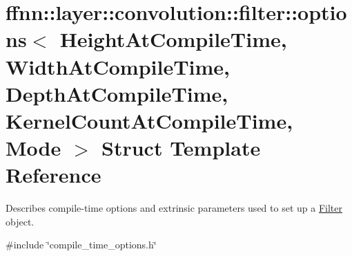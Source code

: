 \hypertarget{structffnn_1_1layer_1_1convolution_1_1filter_1_1options}{\section{ffnn\-:\-:layer\-:\-:convolution\-:\-:filter\-:\-:options$<$ Height\-At\-Compile\-Time, Width\-At\-Compile\-Time, Depth\-At\-Compile\-Time, Kernel\-Count\-At\-Compile\-Time, Mode $>$ Struct Template Reference}
\label{structffnn_1_1layer_1_1convolution_1_1filter_1_1options}
}


Describes compile-\/time options and extrinsic parameters used to set up a \hyperlink{classffnn_1_1layer_1_1convolution_1_1_filter}{Filter} object.  




{\ttfamily \#include \char`\"{}compile\-\_\-time\-\_\-options.\-h\char`\"{}}


